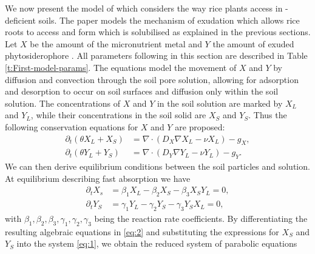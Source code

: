 \documentclass[11pt]{article}
\numberwithin{equation}{section}
\begin{document}
We now present the model of \cite{Ptashnyk-2011} which considers the way rice plants access  in -deficient soils. The paper models the mechanism of  exudation which allows rice roots to access  and form  which is solubilised as explained in the previous sections. Let $X$ be the amount of the micronutrient metal  and $Y$ the amount of exuded phytosiderophore . All parameters following in this section are described in Table \ref{t:First-model-params}. 
The equations model the movement of $X$ and $Y$ by diffusion and convection through the soil pore solution, allowing for adsorption and desorption to occur on soil surfaces and diffusion only within the soil solution. 
The concentrations of $X$ and $Y$ in the soil solution are marked by $X_L$ and $Y_L$, while their concentrations in the soil solid are $X_S$ and $Y_S$.
Thus the following conservation equations for $X$ and $Y$ are proposed:
\begin{equation}
\begin{aligned}
    \partial_t(\theta X_L+X_S)&=\nabla \cdot (D_X\nabla X_L-\nu X_L)-g_X,\\
    \partial_t(\theta Y_L+Y_S)&=\nabla \cdot (D_Y\nabla Y_L-\nu Y_L)-g_Y.
    \label{eq:1}
\end{aligned}
\end{equation}
We can then derive equilibrium conditions between the soil particles and solution. %
At equilibrium describing fast absorption we have
\begin{equation}
    \begin{aligned}
        \partial_t X_s&=\beta_1X_L-\beta_2X_S-\beta_3X_SY_L=0,\\
        \partial_t Y_S&=\gamma_1Y_L-\gamma_2Y_S-\gamma_3Y_SX_L=0,
    \end{aligned}
    \label{eq:2}
\end{equation}
with $\beta_1,\beta_2,\beta_3,\gamma_1,\gamma_2,\gamma_3$ being the reaction rate coefficients.
By differentiating the resulting algebraic equations in \eqref{eq:2} and substituting the expressions for $X_S$ and $Y_S$ into the system \eqref{eq:1}, we obtain the reduced system of parabolic equations
\end{document}
